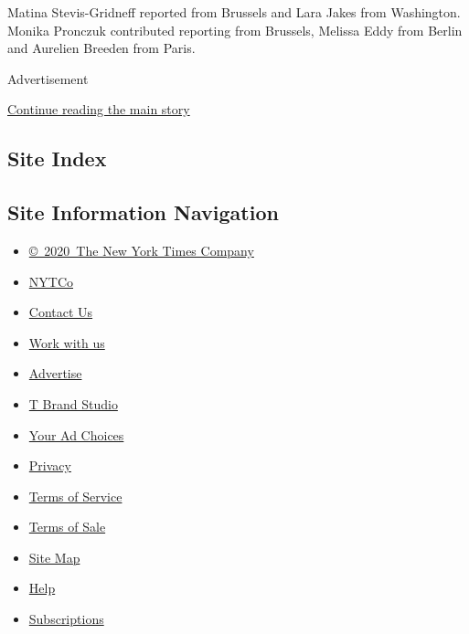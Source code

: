 Matina Stevis-Gridneff reported from Brussels and Lara Jakes from
Washington. Monika Pronczuk contributed reporting from Brussels, Melissa
Eddy from Berlin and Aurelien Breeden from Paris.

Advertisement

\protect\hyperlink{after-bottom}{Continue reading the main story}

\hypertarget{site-index}{%
\subsection{Site Index}\label{site-index}}

\hypertarget{site-information-navigation}{%
\subsection{Site Information
Navigation}\label{site-information-navigation}}

\begin{itemize}
\tightlist
\item
  \href{https://help.nytimes3xbfgragh.onion/hc/en-us/articles/115014792127-Copyright-notice}{©~2020~The
  New York Times Company}
\end{itemize}

\begin{itemize}
\tightlist
\item
  \href{https://www.nytco.com/}{NYTCo}
\item
  \href{https://help.nytimes3xbfgragh.onion/hc/en-us/articles/115015385887-Contact-Us}{Contact
  Us}
\item
  \href{https://www.nytco.com/careers/}{Work with us}
\item
  \href{https://nytmediakit.com/}{Advertise}
\item
  \href{http://www.tbrandstudio.com/}{T Brand Studio}
\item
  \href{https://www.nytimes3xbfgragh.onion/privacy/cookie-policy\#how-do-i-manage-trackers}{Your
  Ad Choices}
\item
  \href{https://www.nytimes3xbfgragh.onion/privacy}{Privacy}
\item
  \href{https://help.nytimes3xbfgragh.onion/hc/en-us/articles/115014893428-Terms-of-service}{Terms
  of Service}
\item
  \href{https://help.nytimes3xbfgragh.onion/hc/en-us/articles/115014893968-Terms-of-sale}{Terms
  of Sale}
\item
  \href{https://spiderbites.nytimes3xbfgragh.onion}{Site Map}
\item
  \href{https://help.nytimes3xbfgragh.onion/hc/en-us}{Help}
\item
  \href{https://www.nytimes3xbfgragh.onion/subscription?campaignId=37WXW}{Subscriptions}
\end{itemize}
